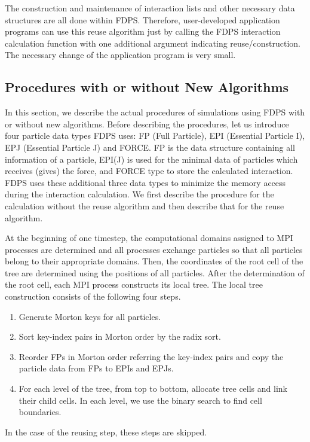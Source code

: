 \documentclass[dvipdfmx]{pasj01}
\begin{document}
The construction and maintenance of interaction lists and other
necessary data structures are all done within FDPS. Therefore,
user-developed application programs can use this reuse algorithm just
by calling the FDPS interaction calculation function with one
additional argument indicating reuse/construction. The necessary
change of the application program is very small.

\subsection{Procedures with or without New Algorithms}
\label{ref:new_alg_pro}

In this section, we describe the actual procedures of simulations
using FDPS with or without new algorithms. Before describing the
procedures, let us introduce four particle data types FDPS uses: FP
(Full Particle), EPI (Essential Particle I), EPJ (Essential Particle
J) and FORCE.  FP is the data structure containing all information of
a particle, EPI(J) is used for the minimal data of particles which
receives (gives) the force, and FORCE type to store the calculated
interaction. FDPS uses these additional three data types to minimize
the memory access during the interaction calculation. We first
describe the procedure for the calculation without the reuse algorithm
and then describe that for the reuse algorithm.

At the beginning of one timestep, the computational domains assigned
to MPI processes are determined and all processes exchange particles
so that all particles belong to their appropriate domains. Then, the
coordinates of the root cell of the tree are determined using the
positions of all particles. After the determination of the root cell,
each MPI process constructs its local tree. The local tree
construction consists of the following four steps.
\begin{enumerate}
\item Generate Morton keys for all particles.
\item Sort key-index pairs in Morton order by the radix sort.
\item Reorder FPs in Morton order referring the key-index pairs and
  copy the particle data from FPs to EPIs and EPJs.
\item For each level of the tree, from top to bottom, allocate tree
  cells and link their child cells. In each level, we use the binary
  search to find cell boundaries.
\end{enumerate}
In the case of the reusing step, these steps are skipped.
\end{document}
